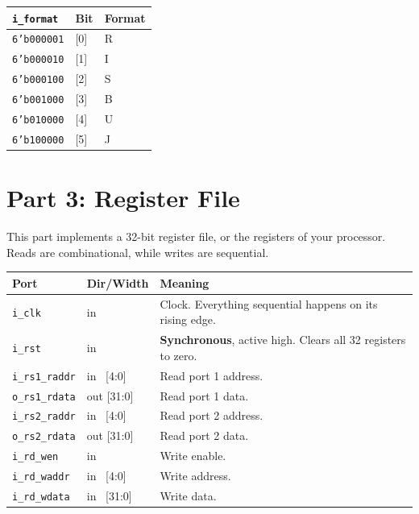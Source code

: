 \documentclass[11pt]{article}
\begin{document}
\begin{center}
\begin{tabular}{@{}lll@{}}
\toprule
\textbf{\texttt{i\_format}} & \textbf{Bit} & \textbf{Format} \\
\midrule
\texttt{6'b000001} & [0] & R \\
\texttt{6'b000010} & [1] & I \\
\texttt{6'b000100} & [2] & S \\
\texttt{6'b001000} & [3] & B \\
\texttt{6'b010000} & [4] & U \\
\texttt{6'b100000} & [5] & J \\
\bottomrule
\end{tabular}
\label{tab:imm}
\end{center}

\newpage

\section{Part 3: Register File}
\label{sec:rf}
This part implements a 32-bit register file, or the registers of your processor. Reads are combinational, while writes are sequential.

\begin{center}
\begin{tabular}{@{}llp{8.2cm}@{}}
\toprule
\textbf{Port} & \textbf{Dir/Width} & \textbf{Meaning} \\
\midrule
\texttt{i\_clk}       & in          & Clock. Everything sequential happens on its rising edge. \\
\texttt{i\_rst}       & in          & \textbf{Synchronous}, active high. Clears all 32 registers to zero. \\
\texttt{i\_rs1\_raddr}& in \ [4:0]  & Read port 1 address. \\
\texttt{o\_rs1\_rdata}& out [31:0]  & Read port 1 data. \\
\texttt{i\_rs2\_raddr}& in \ [4:0]  & Read port 2 address. \\
\texttt{o\_rs2\_rdata}& out [31:0]  & Read port 2 data.\\
\texttt{i\_rd\_wen}   & in          & Write enable. \\
\texttt{i\_rd\_waddr} & in \ [4:0]  & Write address. \\
\texttt{i\_rd\_wdata} & in \ [31:0] & Write data. \\
\bottomrule
\end{tabular}
\end{center}
\end{document}
